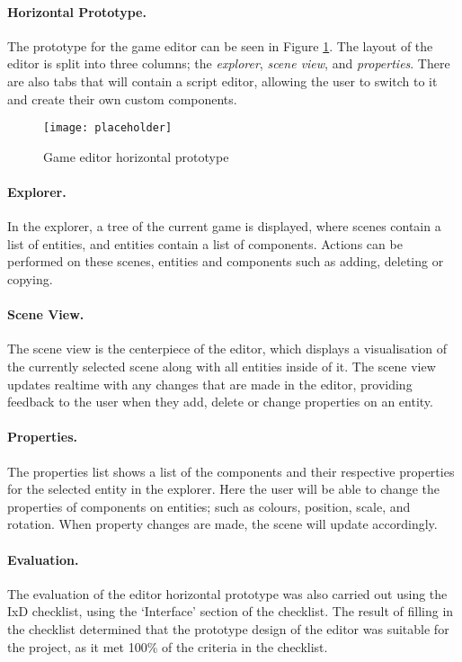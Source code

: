 
	\paragraph{Horizontal Prototype.}
	The prototype for the game editor can be seen in Figure \ref{fig:gameeditorprototype}. The layout of the editor is split into three columns; the \emph{explorer}, \emph{scene view}, and \emph{properties}. There are also tabs that will contain a script editor, allowing the user to switch to it and create their own custom components.

	\begin{figure}[h]
		\centering
		\texttt{[image: placeholder]}
		\caption{Game editor horizontal prototype}
		\label{fig:gameeditorprototype}
	\end{figure}

	\paragraph{Explorer.}
	In the explorer, a tree of the current game is displayed, where scenes contain a list of entities, and entities contain a list of components. Actions can be performed on these scenes, entities and components such as adding, deleting or copying.

	\paragraph{Scene View.}
	The scene view is the centerpiece of the editor, which displays a visualisation of the currently selected scene along with all entities inside of it. The scene view updates realtime with any changes that are made in the editor, providing feedback to the user when they add, delete or change properties on an entity.

	\paragraph{Properties.}
	The properties list shows a list of the components and their respective properties for the selected entity in the explorer. Here the user will be able to change the properties of components on entities; such as colours, position, scale, and rotation. When property changes are made, the scene will update accordingly.

	\paragraph{Evaluation.}
	The evaluation of the editor horizontal prototype was also carried out using the IxD checklist, using the `Interface' section of the checklist. The result of filling in the checklist determined that the prototype design of the editor was suitable for the project, as it met 100\% of the criteria in the checklist.


